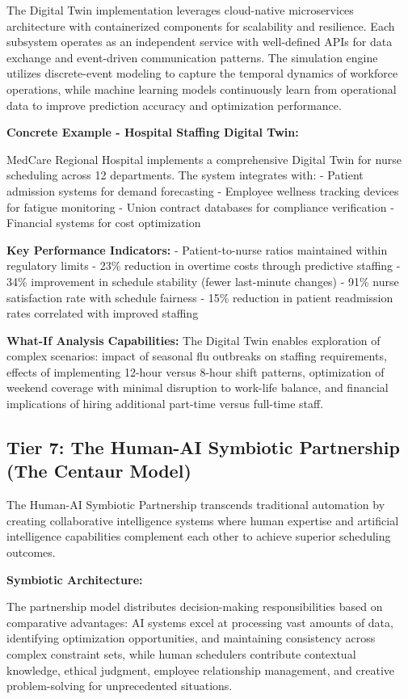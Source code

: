 \documentclass{article}
\begin{document}
The Digital Twin implementation leverages cloud-native microservices architecture with containerized components for scalability and resilience. Each subsystem operates as an independent service with well-defined APIs for data exchange and event-driven communication patterns. The simulation engine utilizes discrete-event modeling to capture the temporal dynamics of workforce operations, while machine learning models continuously learn from operational data to improve prediction accuracy and optimization performance.

\textbf{Concrete Example - Hospital Staffing Digital Twin:}

MedCare Regional Hospital implements a comprehensive Digital Twin for nurse scheduling across 12 departments. The system integrates with:
- Patient admission systems for demand forecasting
- Employee wellness tracking devices for fatigue monitoring  
- Union contract databases for compliance verification
- Financial systems for cost optimization

\textbf{Key Performance Indicators:}
- Patient-to-nurse ratios maintained within regulatory limits
- 23\% reduction in overtime costs through predictive staffing
- 34\% improvement in schedule stability (fewer last-minute changes)
- 91\% nurse satisfaction rate with schedule fairness
- 15\% reduction in patient readmission rates correlated with improved staffing

\textbf{What-If Analysis Capabilities:}
The Digital Twin enables exploration of complex scenarios: impact of seasonal flu outbreaks on staffing requirements, effects of implementing 12-hour versus 8-hour shift patterns, optimization of weekend coverage with minimal disruption to work-life balance, and financial implications of hiring additional part-time versus full-time staff.

\subsection{Tier 7: The Human-AI Symbiotic Partnership (The Centaur Model)}

The Human-AI Symbiotic Partnership transcends traditional automation by creating collaborative intelligence systems where human expertise and artificial intelligence capabilities complement each other to achieve superior scheduling outcomes.

\textbf{Symbiotic Architecture:}

The partnership model distributes decision-making responsibilities based on comparative advantages: AI systems excel at processing vast amounts of data, identifying optimization opportunities, and maintaining consistency across complex constraint sets, while human schedulers contribute contextual knowledge, ethical judgment, employee relationship management, and creative problem-solving for unprecedented situations.
\end{document}
